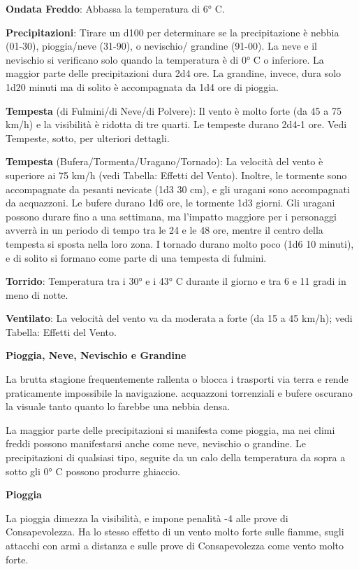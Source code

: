 \documentclass[a4paper,11pt,twoside,openany]{book}
\begin{document}
\textbf{Ondata Freddo}: Abbassa la temperatura di 6° C.

\textbf{Precipitazioni}: Tirare un d100 per determinare se la precipitazione è nebbia (01-30), pioggia/neve (31-90), o nevischio/ grandine (91-00). La neve e il nevischio si verificano solo quando la temperatura è di 0° C o inferiore. La maggior parte delle precipitazioni dura 2d4 ore. La grandine, invece, dura solo 1d20 minuti ma di solito è accompagnata da 1d4 ore di pioggia.

\textbf{Tempesta} (di Fulmini/di Neve/di Polvere): Il vento è molto forte (da 45 a 75 km/h) e la visibilità è ridotta di tre quarti. Le tempeste durano 2d4-1 ore. Vedi Tempeste, sotto, per ulteriori dettagli.

\textbf{Tempesta} (Bufera/Tormenta/Uragano/Tornado): La velocità del vento è superiore ai 75 km/h (vedi Tabella: Effetti del Vento). Inoltre, le tormente sono accompagnate da pesanti nevicate (1d3 \texttimes{} 30 cm), e gli uragani sono accompagnati da acquazzoni. Le bufere durano 1d6 ore, le tormente 1d3 giorni. Gli uragani possono durare fino a una settimana, ma l'impatto maggiore per i personaggi avverrà in un periodo di tempo tra le 24 e le 48 ore, mentre il centro della tempesta si sposta nella loro zona. I tornado durano molto poco (1d6 \texttimes{} 10 minuti), e di solito si formano come parte di una tempesta di fulmini.

\textbf{Torrido}: Temperatura tra i 30° e i 43° C durante il giorno e tra 6 e 11 gradi in meno di notte.

\textbf{Ventilato}: La velocità del vento va da moderata a forte (da 15 a 45 km/h); vedi Tabella: Effetti del Vento.

\textbf{Pioggia, Neve, Nevischio e Grandine}

La brutta stagione frequentemente rallenta o blocca i trasporti via terra e rende praticamente impossibile la navigazione. acquazzoni torrenziali e bufere oscurano la visuale tanto quanto lo farebbe una nebbia densa.

La maggior parte delle precipitazioni si manifesta come pioggia, ma nei climi freddi possono manifestarsi anche come neve, nevischio o grandine. Le precipitazioni di qualsiasi tipo, seguite da un calo della temperatura da sopra a sotto gli 0° C possono produrre ghiaccio.

\textbf{Pioggia}

La pioggia dimezza la visibilità, e impone penalità -4 alle prove di Consapevolezza. Ha lo stesso effetto di un vento molto forte sulle fiamme, sugli attacchi con armi a distanza e sulle prove di Consapevolezza come vento molto forte.
\end{document}
